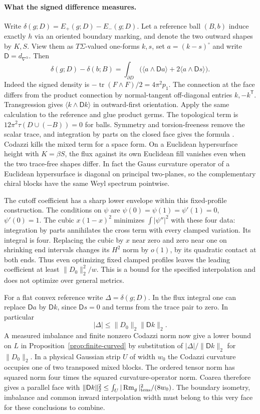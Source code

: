 \documentclass[11pt,letterpaper]{article}
\numberwithin{equation}{section}
\DeclareMathOperator{\Rm}{Rm}
\DeclareMathOperator{\tr}{tr}
\begin{document}
\paragraph{What the signed difference measures.}
Write \(\delta(g;D)=E_+(g;D)-E_-(g;D)\). Let a reference ball
\((B,b)\) induce exactly \(h\) via an oriented boundary marking, and
denote the two outward shapes by \(K,S\). View them as
\(T\Sigma\)-valued one-forms \(k,s\), set \(a=(k-s)^\circ\) and write
\(\mathsf D=d_{\nabla^h}\). Then
\[
 \delta(g;D)-\delta(b;B)
 =\int_{\partial D}\bigl(\langle a\wedge\mathsf D a\rangle+
                 2\langle a\wedge\mathsf D s\rangle\bigr).
\]
Indeed the signed density is \(-\tr(F\wedge F)/2=4\pi^2p_1\).
The connection at the face differs from the product connection
by normal-tangent off-diagonal entries \(k,-k^{\mathsf T}\).
Transgression gives \(\langle k\wedge\mathsf D k\rangle\) in
outward-first orientation. Apply the same calculation to the reference
and glue product germs. The topological term is
\(12\pi^2\tau(D\cup(-B))=0\) for balls. Symmetry and torsion-freeness
remove the scalar trace, and integration by parts on the closed
face gives the formula
\cite[\S3]{ChernSimons1974Characteristic}\cite{Hirzebruch1971Signature}.
Codazzi kills the mixed term for a space form. On a Euclidean
hypersurface height with \(K=\beta S\), the flux against its own
Euclidean fill vanishes even when the two trace-free shapes differ.
In fact the Gauss curvature operator of a Euclidean hypersurface is
diagonal on principal two-planes, so the complementary chiral
blocks have the same Weyl spectrum pointwise.

The cutoff coefficient has a sharp lower envelope within this
fixed-profile construction. The conditions on \(\psi\) are
\(\psi(0)=\psi(1)=\psi'(1)=0\), \(\psi'(0)=1\).
The cubic \(x(1-x)^2\) minimizes \(\int|\psi''|^2\) with
these four data: integration by parts annihilates the cross term
with every clamped variation. Its integral is four. Replacing the
cubic by \(x\) near zero and zero near one on shrinking end
intervals changes its \(H^2\) norm by \(o(1)\), by its quadratic
contact at both ends. Thus even optimizing fixed clamped profiles
leaves the leading coefficient at least \(\|D_0\|_2^2/w\).
This is a bound for the specified interpolation and does not
optimize over general metrics.

For a flat convex reference write
\(\Delta=\delta(g;D)\). In the flux integral one can replace
\(\mathsf D a\) by \(\mathsf D k\), since \(\mathsf D s=0\)
and terms from the trace pair to zero. In particular
\[
 |\Delta|\le \|D_0\|_2\|\mathsf D k\|_2 .
\]
A measured imbalance and finite nonzero Codazzi norm now give a
lower bound on \(L\) in Proposition~\ref{prop:finite-curved}
by substitution of \(|\Delta|/\|\mathsf D k\|_2\) for
\(\|D_0\|_2\). In a physical Gaussian strip \(U\) of width \(w_0\)
the Codazzi curvature occupies one of two transposed mixed blocks.
The ordered tensor norm has squared norm four times the squared
curvature-operator norm. Coarea therefore gives a parallel face with
\(\|\mathsf D k\|_2^2\le \int_U|\Rm_g|_{\rm tens}^2/(8w_0)\).
The boundary isometry, imbalance and common inward interpolation
width must belong to this very face for these conclusions to combine.
\end{document}
